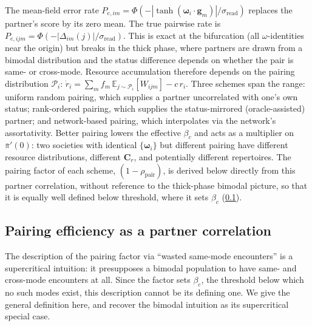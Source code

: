 \documentclass[
  aps,prx,
  preprint,
  superscriptaddress,
  nofootinbib
]{revtex4-2}
\newcommand{\w}{\bm{\omega}}
\newcommand{\g}{\mathbf{g}}
\newcommand{\Cr}{\mathbf{C}_r}
\newcommand{\rhopair}{\rho_{\mathrm{pair}}}
\newcommand{\sread}{\sigma_{\mathrm{read}}}
\newcommand{\pibar}{\bar\pi}
\begin{document}
\noindent The mean-field error rate $P_{e,im}=\Phi(-|\tanh(\w_i\cdot\g_m)|/\sread)$ replaces the partner's score by its zero mean. The true pairwise rate is $P_{e,ijm}=\Phi(-|\Delta_{im}(j)|/\sread)$. This is exact at the bifurcation (all $\omega$-identities near the origin) but breaks in the thick phase, where partners are drawn from a bimodal distribution and the status difference depends on whether the pair is same- or cross-mode. Resource accumulation therefore depends on the pairing distribution $\mathcal P_i$: $\dot r_i=\sum_m f_m\,\mathbb{E}_{j\sim\mathcal P_i}[W_{ijm}]-c\,r_i$. Three schemes span the range: uniform random pairing, which supplies a partner uncorrelated with one's own status; rank-ordered pairing, which supplies the status-mirrored (oracle-assisted) partner; and network-based pairing, which interpolates via the network's assortativity. Better pairing lowers the effective $\beta_c$ and acts as a multiplier on $\pibar'(0)$: two societies with identical $\{\w_i\}$ but different pairing have different resource distributions, different $\Cr$, and potentially different repertoires. The pairing factor of each scheme, $(1-\rhopair)$, is derived below directly from this partner correlation, without reference to the thick-phase bimodal picture, so that it is equally well defined below threshold, where it sets $\beta_c$ (\cref{sm:pairing-rho}).

\subsection{Pairing efficiency as a partner correlation}\label{sm:pairing-rho}

\noindent The description of the pairing factor via ``wasted same-mode encounters'' is a supercritical intuition: it presupposes a bimodal population to have same- and cross-mode encounters at all. Since the factor sets $\beta_c$, the threshold below which no such modes exist, this description cannot be its defining one. We give the general definition here, and recover the bimodal intuition as its supercritical special case.
\end{document}
